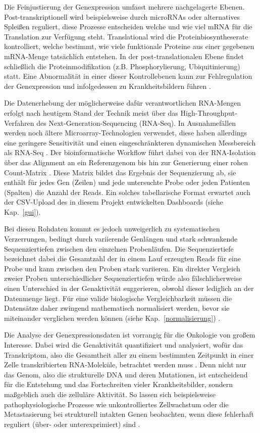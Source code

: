 \documentclass[12pt]{article}
\begin{document}
Die Feinjustierung der Genexpression umfasst mehrere nachgelagerte Ebenen. Post-transkriptionell wird beispielsweise durch microRNAs oder alternatives Spleißen reguliert, diese Prozesse entscheiden welche und wie viel mRNA für die Translation zur Verfügung steht. Translational wird die Proteinbiosyntheserate kontrolliert, welche bestimmt, wie viele funktionale Proteine aus einer gegebenen mRNA-Menge tatsächlich entstehen. In der post-translationalen Ebene findet schließlich die Proteinmodifikation (z.B. Phosphorylierung, Ubiquitinierung) statt. Eine Abnormalität in einer dieser Kontrollebenen kann zur Fehlregulation der Genexpression und infolgedessen zu Krankheitsbildern führen \cite{LeeYoung2013}.

Die Datenerhebung der möglicherweise dafür verantwortlichen RNA-Mengen erfolgt nach heutigem Stand der Technik meist über das High-Throughput-Verfahren des Next-Generation-Sequencing (RNA-Seq). In Ausnahmefällen werden noch ältere Microarray-Technologien verwendet, diese haben allerdings eine geringere Sensitivität und einen eingeschränkteren dynamischen Messbereich als RNA-Seq \cite{Wang2009}. Der bioinformatische Workflow führt dabei von der RNA-Isolation über das Alignment an ein Referenzgenom bis hin zur Generierung einer rohen Count-Matrix \cite{Kukurba2015}. Diese Matrix bildet das Ergebnis der Sequenzierung ab, sie enthält für jedes Gen (Zeilen) und jede untersuchte Probe oder jeden Patienten (Spalten) die Anzahl der Reads. Ein solches tabellarische Format erwartet auch der CSV-Upload des in diesem Projekt entwickelten Dashboards (siehe Kap.~\ref{gui}).

Bei diesen Rohdaten kommt es jedoch unweigerlich zu systematischen Verzerrungen, bedingt durch variierende Genlängen und stark schwankende Sequenziertiefen zwischen den einzelnen Probenläufen. Die Sequenziertiefe bezeichnet dabei die Gesamtzahl der in einem Lauf erzeugten Reads für eine Probe und kann zwischen den Proben stark variieren. Ein direkter Vergleich zweier Proben unterschiedlicher Sequenziertiefen würde also fälschlicherweise einen Unterschied in der Genaktivität suggerieren, obwohl dieser lediglich an der Datenmenge liegt. Für eine valide biologische Vergleichbarkeit müssen die Datensätze daher zwingend mathematisch normalisiert werden, bevor sie miteinander verglichen werden können (siehe Kap.~\ref{normalisierung}) \cite{Oshlack2010}.

Die Analyse der Genexpressionsdaten ist vorrangig für die Onkologie von großem Interesse. Dabei wird die Genaktivität quantifiziert und analysiert, wofür das Transkriptom, also die Gesamtheit aller zu einem bestimmten Zeitpunkt in einer Zelle transkribierten RNA-Moleküle, betrachtet werden muss \cite{Conesa2016}. Denn nicht nur das Genom, also die strukturelle DNA und deren Mutationen, ist entscheidend für die Entstehung und das Fortschreiten vieler Krankheitsbilder, sondern maßgeblich auch die zelluläre Aktivität. So lassen sich beispielsweise pathophysiologische Prozesse wie unkontrolliertes Zellwachstum oder die Metastasierung bei strukturell intakten Genen beobachten, wenn diese fehlerhaft reguliert (über- oder unterexprimiert) sind \cite{Vogelstein2013}.
\end{document}
